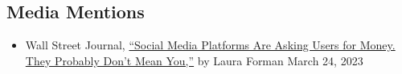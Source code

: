 \documentclass[margin, line, centered, 10pt]{res}
\begin{document}
\begin{resume}

\section{\sc Media Mentions}
\begin{itemize}
\item Wall Street Journal, \href{https://www.wsj.com/articles/social-media-platforms-are-asking-users-for-money-they-probably-dont-mean-you-f5c0cc28}{``Social Media Platforms Are Asking Users for Money. They Probably Don't Mean You,''} by Laura Forman March 24, 2023


\end{itemize}
\end{resume}
\end{document}
